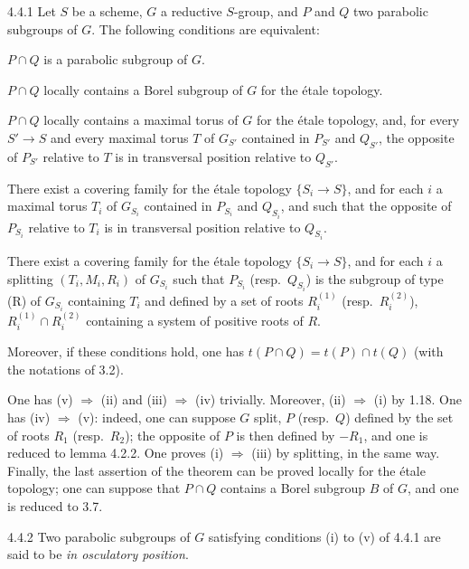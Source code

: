 \begin{proposition}{4.4.1}\label{XXVI.4.4.1}
Let $S$ be a scheme, $G$ a reductive $S$-group, and $P$ and $Q$ two parabolic subgroups of $G$. The following conditions are equivalent:
\begin{enumeratei}
\item $P\cap Q$ is a parabolic subgroup of $G$.
\item $P\cap Q$ locally contains a Borel subgroup of $G$ for the \'etale topology.
\item $P\cap Q$ locally contains a maximal torus of $G$ for the \'etale topology, and, for every $S'\to S$ and every maximal torus $T$ of $G_{S'}$ contained in $P_{S'}$ and $Q_{S'}$, the opposite of $P_{S'}$ relative to $T$ is in transversal position relative to $Q_{S'}$.
\item There exist a covering family for the \'etale topology $\{S_i\to S\}$, and for each $i$ a maximal torus $T_i$ of $G_{S_i}$ contained in $P_{S_i}$ and $Q_{S_i}$, and such that the opposite of $P_{S_i}$ relative to $T_i$ is in transversal position relative to $Q_{S_i}$.
\item There exist a covering family for the \'etale topology $\{S_i\to S\}$, and for each $i$ a splitting $(T_i,M_i,R_i)$ of $G_{S_i}$ such that $P_{S_i}$ (resp.~$Q_{S_i}$) is the subgroup of type (R) of $G_{S_i}$ containing $T_i$ and defined by a set of roots $R_i^{(1)}$ (resp.~$R_i^{(2)}$), $R_i^{(1)}\cap R_i^{(2)}$ containing a system of positive roots of $R$.
\end{enumeratei}
Moreover, if these conditions hold, one has $t(P\cap Q)=t(P)\cap t(Q)$ (with the notations of 3.2).
\end{proposition}
One has (v) $\Rightarrow$ (ii) and (iii) $\Rightarrow$ (iv) trivially. Moreover, (ii) $\Rightarrow$ (i) by 1.18. One has (iv) $\Rightarrow$ (v): indeed, one can suppose $G$ split, $P$ (resp.~$Q$) defined by the set of roots $R_1$ (resp.~$R_2$); the opposite of $P$ is then defined by $-R_1$, and one is reduced to lemma 4.2.2. One proves (i) $\Rightarrow$ (iii) by splitting, in the same way. Finally, the last assertion of the theorem can be proved locally for the \'etale topology; one can suppose that $P\cap Q$ contains a Borel subgroup $B$ of $G$, and one is reduced to 3.7.
\begin{definition}{4.4.2}\label{XXVI.4.4.2}
Two parabolic subgroups of $G$ satisfying conditions (i) to (v) of 4.4.1 are said to be \emph{in osculatory position}.
\end{definition}
